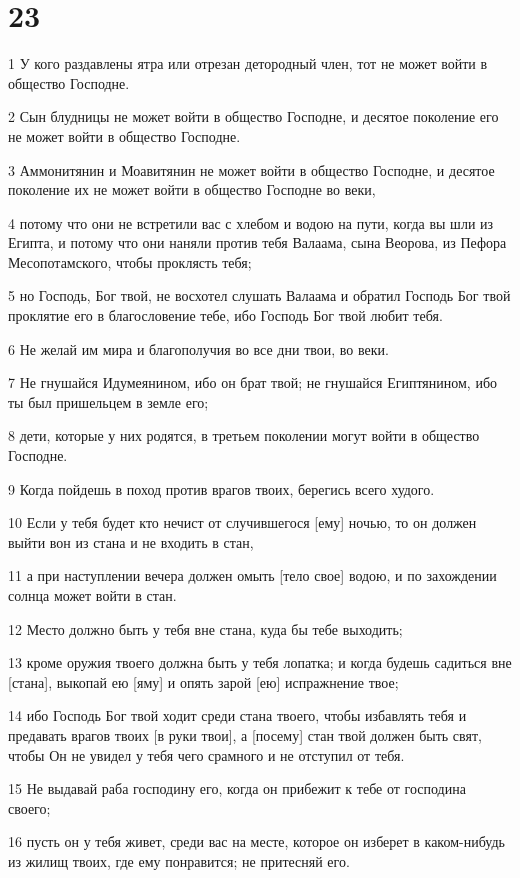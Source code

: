 \chapter{23}

\par 1 У кого раздавлены ятра или отрезан детородный член, тот не может войти в общество Господне.
\par 2 Сын блудницы не может войти в общество Господне, и десятое поколение его не может войти в общество Господне.
\par 3 Аммонитянин и Моавитянин не может войти в общество Господне, и десятое поколение их не может войти в общество Господне во веки,
\par 4 потому что они не встретили вас с хлебом и водою на пути, когда вы шли из Египта, и потому что они наняли против тебя Валаама, сына Веорова, из Пефора Месопотамского, чтобы проклясть тебя;
\par 5 но Господь, Бог твой, не восхотел слушать Валаама и обратил Господь Бог твой проклятие его в благословение тебе, ибо Господь Бог твой любит тебя.
\par 6 Не желай им мира и благополучия во все дни твои, во веки.
\par 7 Не гнушайся Идумеянином, ибо он брат твой; не гнушайся Египтянином, ибо ты был пришельцем в земле его;
\par 8 дети, которые у них родятся, в третьем поколении могут войти в общество Господне.
\par 9 Когда пойдешь в поход против врагов твоих, берегись всего худого.
\par 10 Если у тебя будет кто нечист от случившегося [ему] ночью, то он должен выйти вон из стана и не входить в стан,
\par 11 а при наступлении вечера должен омыть [тело свое] водою, и по захождении солнца может войти в стан.
\par 12 Место должно быть у тебя вне стана, куда бы тебе выходить;
\par 13 кроме оружия твоего должна быть у тебя лопатка; и когда будешь садиться вне [стана], выкопай ею [яму] и опять зарой [ею] испражнение твое;
\par 14 ибо Господь Бог твой ходит среди стана твоего, чтобы избавлять тебя и предавать врагов твоих [в руки твои], а [посему] стан твой должен быть свят, чтобы Он не увидел у тебя чего срамного и не отступил от тебя.
\par 15 Не выдавай раба господину его, когда он прибежит к тебе от господина своего;
\par 16 пусть он у тебя живет, среди вас на месте, которое он изберет в каком-нибудь из жилищ твоих, где ему понравится; не притесняй его.
